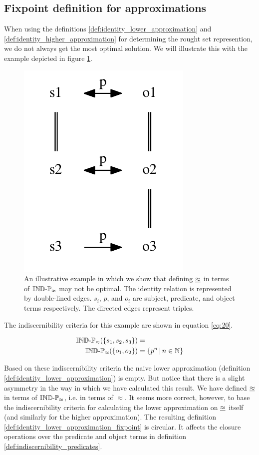 \subsection{Fixpoint definition for approximations}

When using the definitions
  \ref{def:identity_lower_approximation} and
  \ref{def:identity_higher_approximation}
  for determining the rought set represention,
  we do not always get the most optimal solution.
We will illustrate this with the example depicted
  in figure \ref{fig:fixpoint}.

\begin{figure}
\label{fig:fixpoint}
\centering
\includegraphics{./img/fixpoint_example}%
\caption{
  An illustrative example in which we show that defining
  $\underline{\approx}$ in terms of $\operatorname{{\mathbb{IND}-\mathbb{P}}}_{\approx}$ may not be optimal.
  The identity relation is represented by double-lined edges.
  $s_i$, $p$, and $o_i$ are subject, predicate, and object terms respectively.
  The directed edges represent triples.
}
\end{figure}

The indiscernibility criteria for this example are shown
  in equation \ref{eq:20}.

\begin{align}
\label{eq:20}
  \operatorname{{\mathbb{IND}-\mathbb{P}}}_{\approx}(\{s_1,s_2,s_3\})
&=\\
  \operatorname{{\mathbb{IND}-\mathbb{P}}}_{\approx}(\{o_1,o_2\})
&=
  \{p^n\,\vert\,n \in \mathbb{N}\}\nonumber
\end{align}

Based on these indiscernibility criteria the naive lower approximation
  (definition \ref{def:identity_lower_approximation}) is empty.
But notice that there is a slight asymmetry in the way in which we have
  calculated this result.
We have defined $\underline{\approx}$ in terms of $\operatorname{{\mathbb{IND}-\mathbb{P}}}_{\approx}$,
  i.e. in terms of $\approx$.
It seems more correct, however, to base the indiscernibility criteria
  for calculating the lower approximation on $\underline{\approx}$ itself
  (and similarly for the higher approximation).
The resulting definition \ref{def:identity_lower_approximation_fixpoint}
  is circular.
It affects the closure operations over the predicate and object terms
  in definition \ref{def:indiscernibility_predicates}.

